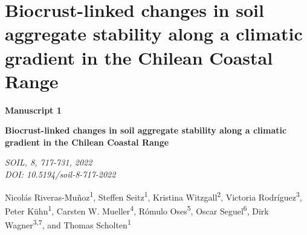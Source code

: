 
\chapter{Biocrust-linked changes in soil aggregate stability along a climatic gradient in the Chilean Coastal Range}

\label{chap:manuscript1} %

\begin{center}
    \textbf{\Large Manuscript 1}
\end{center} 

\vspace{0.1cm}

\begin{center}
    \textbf{\huge Biocrust-linked changes in soil aggregate stability along a climatic gradient in the Chilean Coastal Range}
\end{center}

\vspace{0.2cm}

\begin{center}
    \textit{SOIL, 8, 717-731, 2022}\\
    \textit{DOI: 10.5194/soil-8-717-2022}
\end{center}

\vspace{0.1cm}

\begin{justify}

    Nicolás Riveras-Muñoz\textsuperscript{1}, Steffen Seitz\textsuperscript{1}, Kristina Witzgall\textsuperscript{2}, Victoria Rodríguez\textsuperscript{3}, Peter Kühn\textsuperscript{1}, Carsten W. Mueller\textsuperscript{4}, Rómulo Oses\textsuperscript{5}, Oscar Seguel\textsuperscript{6}, Dirk Wagner\textsuperscript{3,7}, and Thomas Scholten\textsuperscript{1}

    \vspace{0.2cm}
\end{justify}

